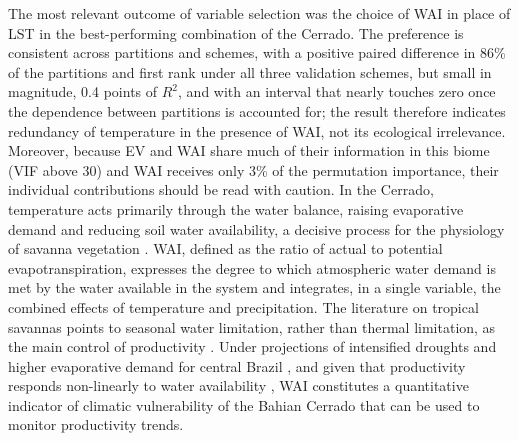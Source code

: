 \documentclass[a4paper,fleqn]{cas-dc}
\begin{document}
The most relevant outcome of variable selection was the choice of WAI in place of LST in the best-performing combination of the Cerrado. The preference is consistent across partitions and schemes, with a positive paired difference in 86\% of the partitions and first rank under all three validation schemes, but small in magnitude, 0.4 points of $R^2$, and with an interval that nearly touches zero once the dependence between partitions is accounted for; the result therefore indicates redundancy of temperature in the presence of WAI, not its ecological irrelevance. Moreover, because EV and WAI share much of their information in this biome (VIF above 30) and WAI receives only 3\% of the permutation importance, their individual contributions should be read with caution. In the Cerrado, temperature acts primarily through the water balance, raising evaporative demand and reducing soil water availability, a decisive process for the physiology of savanna vegetation \citep{bucci2008,arruda2016}. WAI, defined as the ratio of actual to potential evapotranspiration, expresses the degree to which atmospheric water demand is met by the water available in the system and integrates, in a single variable, the combined effects of temperature and precipitation. The literature on tropical savannas points to seasonal water limitation, rather than thermal limitation, as the main control of productivity \citep{vourlitis2022}. Under projections of intensified droughts and higher evaporative demand for central Brazil \citep{ipcc2022}, and given that productivity responds non-linearly to water availability \citep{mwangi2025}, WAI constitutes a quantitative indicator of climatic vulnerability of the Bahian Cerrado that can be used to monitor productivity trends.
\end{document}
